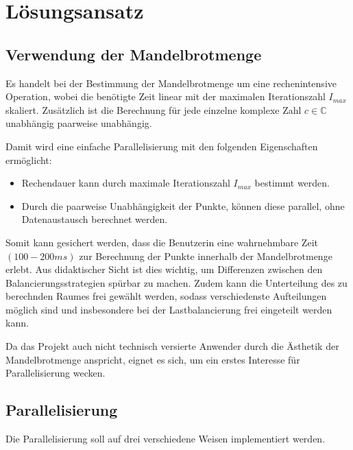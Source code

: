 \section{Lösungsansatz}

\subsection{Verwendung der Mandelbrotmenge}

Es handelt bei der Bestimmung der Mandelbrotmenge um eine rechenintensive Operation, wobei
die benötigte Zeit linear mit der maximalen Iterationszahl \( I_{max} \) skaliert.
Zusätzlich ist die Berechnung für jede einzelne komplexe Zahl \( c\in \mathbb{C} \)	unabhängig paarweise unabhängig.

Damit wird eine einfache Parallelisierung mit den folgenden Eigenschaften ermöglicht:
\begin{itemize}
	\item Rechendauer kann durch maximale Iterationszahl \( I_{max} \) bestimmt werden.
	\item Durch die paarweise Unabhängigkeit der Punkte, können diese parallel, ohne Datenaustausch berechnet werden.
\end{itemize}

Somit kann gesichert werden, dass die Benutzerin eine wahrnehmbare Zeit \( (100 - 200 ms) \) zur Berechnung der Punkte innerhalb
der Mandelbrotmenge erlebt.
Aus didaktischer Sicht ist dies wichtig, um Differenzen zwischen den Balancierungsstrategien spürbar zu machen.
Zudem kann die Unterteilung des zu berechnden Raumes frei gewählt werden, sodass
verschiedenste Aufteilungen möglich sind und insbesondere bei der Lastbalancierung frei eingeteilt werden kann.

Da das Projekt auch nicht technisch versierte Anwender durch die Ästhetik der Mandelbrotmenge anspricht, eignet es
sich, um ein erstes Interesse für Parallelisierung wecken.


\subsection{Parallelisierung}

Die Parallelisierung soll auf drei verschiedene Weisen implementiert werden.


